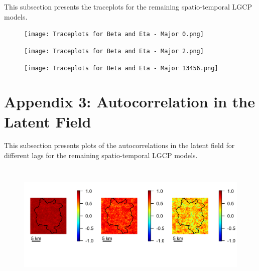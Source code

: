     This subsection presents the traceplots for the remaining spatio-temporal LGCP models.

    \begin{figure}[H]
        \begin{center}
            \texttt{[image: Traceplots for Beta and Eta - Major 0.png]}
        \end{center}
    \end{figure}

    \begin{figure}[h]
        \begin{center}
            \texttt{[image: Traceplots for Beta and Eta - Major 2.png]}
        \end{center}
    \end{figure}

    \begin{figure}[H]
        \begin{center}
            \texttt{[image: Traceplots for Beta and Eta - Major 13456.png]}
        \end{center}
    \end{figure}

    \newpage


\section*{Appendix 3: Autocorrelation in the Latent Field} \label{app:latent-field}

    This subsection presents plots of the autocorrelations in the latent field for different lags for the remaining spatio-temporal LGCP models.

    \begin{figure}[H]
        \begin{center}
            \includegraphics[width = \linewidth, height = 60mm]{Autocorrelations in the Latent Field - All Cases.png}
        \end{center}
    \end{figure}

